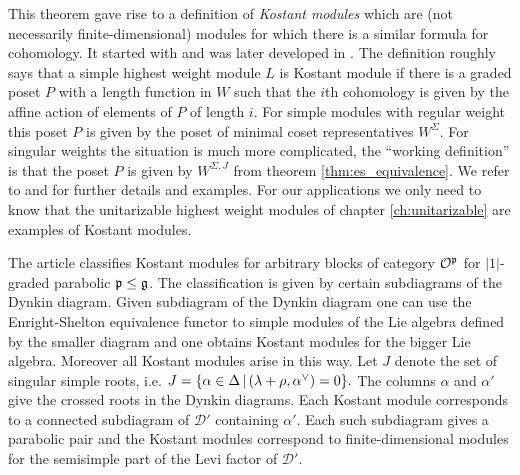 This theorem gave rise to a definition of \emph{Kostant modules} which are (not necessarily finite-dimensional) modules for which there is a similar formula for cohomology. It started with \cite{collingwood_mathfrakn-homology_1985} and was later developed in \cite{boe_kostant_2009}. The definition roughly says that a simple highest weight module $L$ is Kostant module if there is a graded poset $P$ with a length function in $W$ such that the $i$th cohomology is given by the affine action of elements of $P$ of length $i$. For simple modules with regular weight this poset $P$ is given by the poset of minimal coset representatives $W^\Sigma$. For singular weights the situation is much more complicated, the ``working definition'' is that the poset $P$ is given by $W^{\Sigma, J}$ from theorem \ref{thm:es_equivalence}. We refer to \cite{boe_kostant_2009} and \cite{enright_diagrams_2014} for further details and examples. For our applications we only need to know that the unitarizable highest weight modules of chapter \ref{ch:unitarizable} are examples of Kostant modules.

The article \cite{boe_kostant_2009} classifies Kostant modules for arbitrary blocks of category $\mathcal{O}^{\mathfrak{p}}$ for $|1|$-graded parabolic $\mathfrak{p} \leq \mathfrak{g}$. The classification is given by certain subdiagrams of the Dynkin diagram. Given subdiagram of the Dynkin diagram one can use the Enright-Shelton equivalence functor to simple modules of the Lie algebra defined by the smaller diagram and one obtains Kostant modules for the bigger Lie algebra. Moreover all Kostant modules arise in this way. Let $J$ denote the set of singular simple roots, i.e. \(J= \{ \alpha \in \Delta \,|\, (\lambda+\rho,\alpha^\vee) = 0 \}.\) The columns $\alpha$ and $\alpha'$ give the crossed roots in the Dynkin diagrams. Each Kostant module corresponds to a connected subdiagram of $\mathcal{D}'$ containing $\alpha'$. Each such subdiagram gives a parabolic pair and the Kostant modules correspond to finite-dimensional modules for the semisimple part of the Levi factor of $\mathcal{D}'$.

